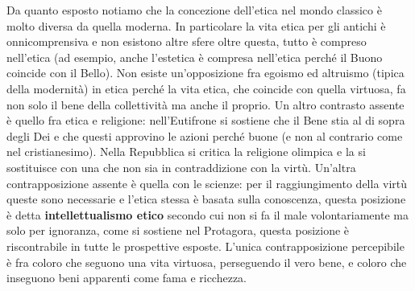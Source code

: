 \documentclass[10pt,a4paper]{article}
\begin{document}
Da quanto esposto notiamo che la concezione dell'etica nel mondo classico è molto diversa da quella moderna. In particolare la vita etica per gli antichi è onnicomprensiva e non esistono altre sfere oltre questa, tutto è compreso nell'etica (ad esempio, anche l'estetica è compresa nell'etica perché il Buono coincide con il Bello). Non esiste un'opposizione fra egoismo ed altruismo (tipica della modernità) in etica perché la vita etica, che coincide con quella virtuosa, fa non solo il bene della collettività ma anche il proprio. Un altro contrasto assente è quello fra etica e religione: nell'Eutifrone si sostiene che il Bene stia al di sopra degli Dei e che questi approvino le azioni perché buone (e non al contrario come nel cristianesimo). Nella Repubblica si critica la religione olimpica e la si sostituisce con una che non sia in contraddizione con la virtù. Un'altra contrapposizione assente è quella con le scienze: per il raggiungimento della virtù queste sono necessarie e l'etica stessa è basata sulla conoscenza, questa posizione è detta \textbf{intellettualismo etico} secondo cui non si fa il male volontariamente ma solo per ignoranza, come si sostiene nel Protagora, questa posizione è riscontrabile in tutte le prospettive esposte. L'unica contrapposizione percepibile è fra coloro che seguono una vita virtuosa, perseguendo il vero bene, e coloro che inseguono beni apparenti come fama e ricchezza. 
\end{document}
